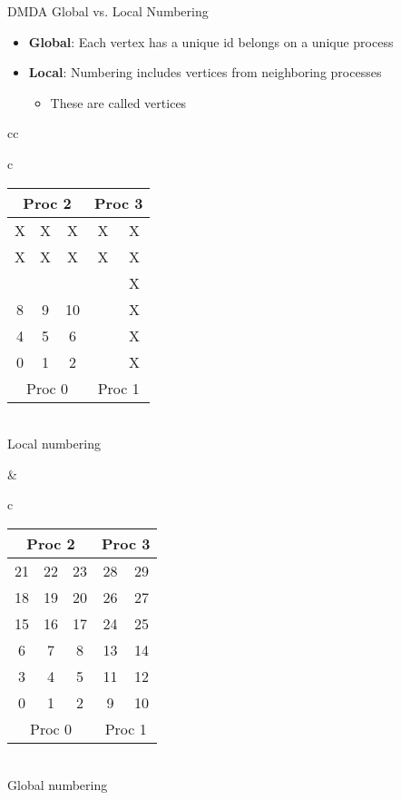 \begin{frame}{DMDA Global vs. Local Numbering}

\begin{itemize}
  \item {\bf Global}: Each vertex has a unique id belongs on a unique process

  \item {\bf Local}: Numbering includes vertices from neighboring processes
  \begin{itemize}
    \item These are called  vertices
  \end{itemize}
\end{itemize}

\begin{center}
\begin{tabular}{cc}
\begin{tabular}{c}
\begin{tabular}{|ccc|cc|}
\hline
\multicolumn{3}{|c|}{Proc 2} & \multicolumn{2}{c|}{Proc 3} \\
\hline
 X &  X &  X &  X &  X \\
 X &  X &  X &  X &  X \\
\cyan{12} & \cyan{13} & \cyan{14} & \cyan{15} &  X \\
\hline
 8 &  9 & 10 & \cyan{11} &  X \\
 4 &  5 &  6 &  \cyan{7} &  X \\
 0 &  1 &  2 &  \cyan{3} &  X \\
\hline
\multicolumn{3}{|c|}{Proc 0} & \multicolumn{2}{c|}{Proc 1} \\
\hline
\end{tabular} \\
Local numbering
\end{tabular}
& 
\begin{tabular}{c}
\begin{tabular}{|ccc|cc|}
\hline
\multicolumn{3}{|c|}{Proc 2} & \multicolumn{2}{c|}{Proc 3} \\
\hline
21 & 22 & 23 & 28 & 29 \\
18 & 19 & 20 & 26 & 27 \\
15 & 16 & 17 & 24 & 25 \\
\hline
 6 &  7 &  8 & 13 & 14 \\
 3 &  4 &  5 & 11 & 12 \\
 0 &  1 &  2 &  9 & 10 \\
\hline
\multicolumn{3}{|c|}{Proc 0} & \multicolumn{2}{c|}{Proc 1} \\
\hline
\end{tabular}\\
Global numbering
\end{tabular}
\end{tabular}
\end{center}
\end{frame}
